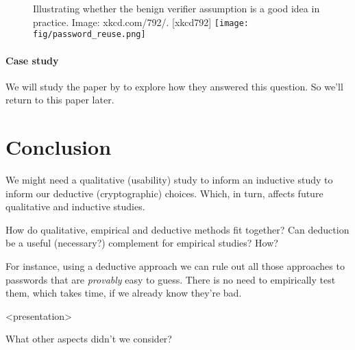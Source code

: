 \begin{frame}
  \begin{figure}
    \begin{sidecaption}[xkcd 792]{%
      Illustrating whether the benign verifier assumption is a good idea in 
      practice.
      Image: xkcd.com/792/.
    }[xkcd792]
      \flushscap
      \texttt{[image: fig/password\_reuse.png]}
    \end{sidecaption}
  \end{figure}
\end{frame}


\paragraph{Case study}

We will study the paper by \textcite{WhyPhishingWorks} to explore how they 
answered this question.
So we'll return to this paper later.


\section{Conclusion}

\begin{frame}
  We might need a qualitative (\eg usability) study
  \only<presentation>{\newline}%
  to inform an inductive study
  to inform our deductive (\eg cryptographic) choices.
  Which, in turn, affects future qualitative and inductive studies.
\end{frame}

\begin{frame}
  \begin{question}
    How do qualitative, empirical and deductive methods fit together?
    Can deduction be a useful (necessary?) complement for empirical studies?
    How?
  \end{question}
\end{frame}

For instance, using a deductive approach we can rule out all those approaches 
to passwords that are \emph{provably} easy to guess.
There is no need to empirically test them, which takes time, if we already know 
they're bad.

\begin{frame}<presentation>
  \begin{exercise}
    What other aspects didn't we consider?
  \end{exercise}
\end{frame}
